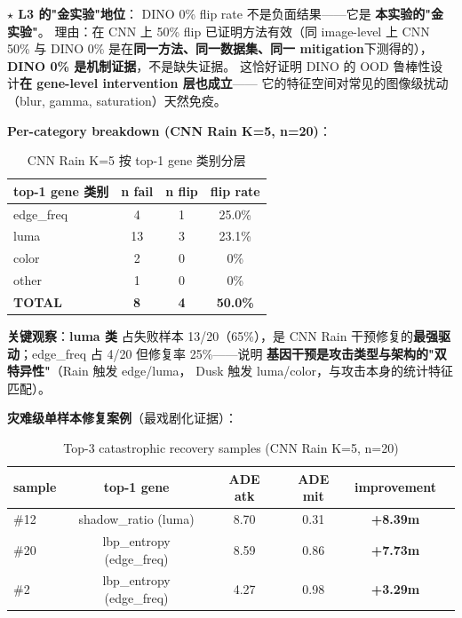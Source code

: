 \documentclass[a4paper,12pt,fontset=fandol]{ctexart}
\begin{document}
{\noindent\textbf{$\star$ L3 的"金实验"地位}：
DINO 0\% flip rate 不是负面结果——它是 \textbf{本实验的"金实验"}。
理由：在 CNN 上 50\% flip 已证明方法有效（同 image-level 上 CNN 50\% 与
DINO 0\% 是在\textbf{同一方法、同一数据集、同一 mitigation}下测得的），
\textbf{DINO 0\% 是机制证据}，不是缺失证据。
这恰好证明 DINO 的 OOD 鲁棒性设计\textbf{在 gene-level intervention 层也成立}——
它的特征空间对常见的图像级扰动（blur, gamma, saturation）天然免疫。

\noindent\textbf{Per-category breakdown (CNN Rain K=5, n=20)}：

\begin{table}[H]
\centering
\small
\caption{CNN Rain K=5 按 top-1 gene 类别分层}
\label{tab:tierc2_cat}
\begin{tabular}{lccc}
\toprule
\textbf{top-1 gene 类别} & \textbf{n fail} & \textbf{n flip} & \textbf{flip rate} \\
\midrule
edge\_freq   & 4  & 1 & 25.0\% \\
luma         & 13 & 3 & 23.1\% \\
color        & 2  & 0 & 0\%   \\
other        & 1  & 0 & 0\%   \\
\midrule
\textbf{TOTAL} & \textbf{8} & \textbf{4} & \textbf{50.0\%} \\
\bottomrule
\end{tabular}
\end{table}

\noindent\textbf{关键观察}：\textbf{luma 类} 占失败样本 13/20（65\%），是 CNN Rain
干预修复的\textbf{最强驱动}；edge\_freq 占 4/20 但修复率 25\%——说明
\textbf{基因干预是攻击类型与架构的"双特异性"}（Rain 触发 edge/luma，
Dusk 触发 luma/color，与攻击本身的统计特征匹配）。

\noindent\textbf{灾难级单样本修复案例}（最戏剧化证据）：

\begin{table}[H]
\centering
\small
\caption{Top-3 catastrophic recovery samples (CNN Rain K=5, n=20)}
\label{tab:tierc2_recoveries}
\begin{tabular}{lccccc}
\toprule
\textbf{sample} & \textbf{top-1 gene} & \textbf{ADE atk} & \textbf{ADE mit} & \textbf{improvement} \\
\midrule
\#12  & shadow\_ratio (luma) & 8.70 & 0.31 & \textbf{+8.39m} \\
\#20  & lbp\_entropy (edge\_freq) & 8.59 & 0.86 & \textbf{+7.73m} \\
\#2   & lbp\_entropy (edge\_freq) & 4.27 & 0.98 & \textbf{+3.29m} \\
\bottomrule
\end{tabular}
\end{table}

}
\end{document}

